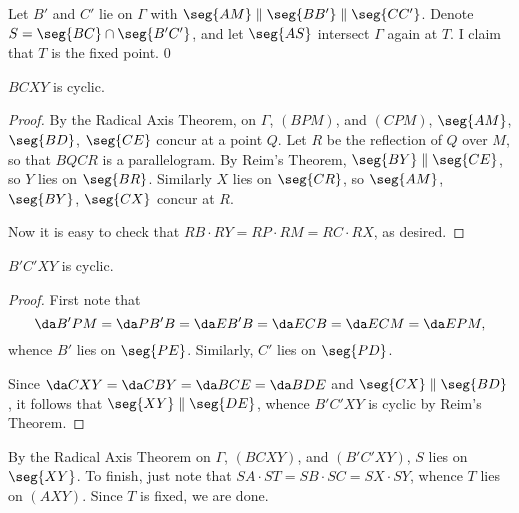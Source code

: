 Let $B'$ and $C'$ lie on $\Gamma$ with $\seg{AM}\parallel\seg{BB'}\parallel\seg{CC'}$. Denote $S=\seg{BC}\cap\seg{B'C'}$, and let $\seg{AS}$ intersect $\Gamma$ again at $T$. I claim that $T$ is the fixed point.
\setcounter{iclaim}0
\begin{iclaim}
    $BCXY$ is cyclic.
\end{iclaim}
\begin{proof}
    By the Radical Axis Theorem, on $\Gamma$, $(BPM)$, and $(CPM)$, $\seg{AM}$, $\seg{BD}$, $\seg{CE}$ concur at a point $Q$. Let $R$ be the reflection of $Q$ over $M$, so that $BQCR$ is a parallelogram. By Reim's Theorem, $\seg{BY}\parallel\seg{CE}$, so $Y$ lies on $\seg{BR}$. Similarly $X$ lies on $\seg{CR}$, so $\seg{AM}$, $\seg{BY}$, $\seg{CX}$ concur at $R$.

    Now it is easy to check that $RB\cdot RY=RP\cdot RM=RC\cdot RX$, as desired.
\end{proof}
\begin{iclaim}
    $B'C'XY$ is cyclic.
\end{iclaim}
\begin{proof}
    First note that \[\da B'PM=\da PB'B=\da EB'B=\da ECB=\da ECM=\da EPM,\]
    whence $B'$ lies on $\seg{PE}$. Similarly, $C'$ lies on $\seg{PD}$.

    Since $\da CXY=\da CBY=\da BCE=\da BDE$ and $\seg{CX}\parallel\seg{BD}$, it follows that $\seg{XY}\parallel\seg{DE}$, whence $B'C'XY$ is cyclic by Reim's Theorem.
\end{proof}

By the Radical Axis Theorem on $\Gamma$, $(BCXY)$, and $(B'C'XY)$, $S$ lies on $\seg{XY}$. To finish, just note that $SA\cdot ST=SB\cdot SC=SX\cdot SY$, whence $T$ lies on $(AXY)$. Since $T$ is fixed, we are done.
